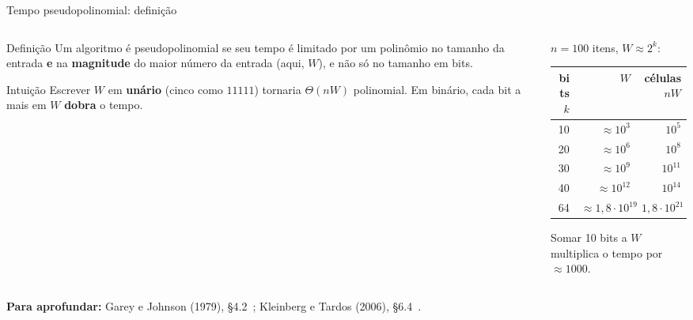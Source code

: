 \documentclass[aspectratio=169,xcolor=table]{beamer}
\newcommand{\fonte}[1]{%
  \vfill
  {\tiny\color{gray!55!black}\textbf{Para aprofundar:} #1\par}%
}
\begin{document}
\begin{frame}{Tempo pseudopolinomial: definição}
  \begin{columns}[c]
    \begin{column}{0.52\textwidth}
      \begin{block}{Definição}
        \scriptsize Um algoritmo é \alert{pseudopolinomial} se seu tempo é limitado por um
        polinômio no tamanho da entrada \textbf{e} na \textbf{magnitude} do maior número da
        entrada (aqui, $W$), e não só no tamanho em bits.
      \end{block}
      \begin{exampleblock}{Intuição}
        \scriptsize Escrever $W$ em \textbf{unário} (cinco como $11111$) tornaria $\Theta(nW)$
        polinomial. Em binário, cada bit a mais em $W$ \textbf{dobra} o tempo.
      \end{exampleblock}
    \end{column}
    \begin{column}{0.44\textwidth}
      \centering\scriptsize
      $n = 100$ itens, $W \approx 2^k$:\\[3pt]
      \begin{tabular}{rrr}
        \toprule
        bits $k$ & $W$ & células $nW$ \\
        \midrule
        10 & $\approx 10^3$ & $10^5$ \\
        20 & $\approx 10^6$ & $10^8$ \\
        30 & $\approx 10^9$ & $10^{11}$ \\
        40 & $\approx 10^{12}$ & $10^{14}$ \\
        64 & $\approx 1{,}8\cdot 10^{19}$ & $1{,}8\cdot 10^{21}$ \\
        \bottomrule
      \end{tabular}
      \medskip

      Somar 10 bits a $W$ multiplica o tempo por $\approx 1000$.
    \end{column}
  \end{columns}
  \fonte{Garey e Johnson (1979), \S 4.2~\cite{garey1979computers};
    Kleinberg e Tardos (2006), \S 6.4~\cite{kleinberg2006algorithm}.}
\end{frame}
\end{document}
